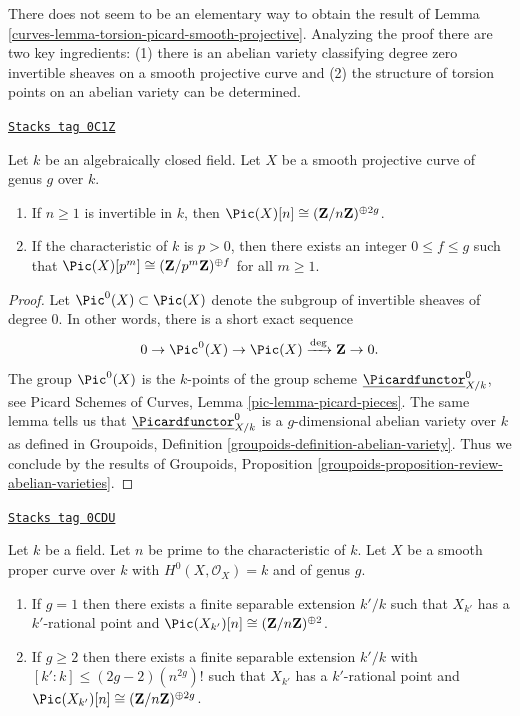 \medskip\noindent
There does not seem to be an elementary way to obtain the result of
Lemma \ref{curves-lemma-torsion-picard-smooth-projective}.
Analyzing the proof there are two key ingredients:
(1) there is an abelian variety classifying degree zero invertible sheaves on
a smooth projective curve and (2) the structure of torsion points on
an abelian variety can be determined.

\begin{lemma}
\label{curves-lemma-torsion-picard-smooth-projective}
\href{https://stacks.math.columbia.edu/tag/0C1Z}{\texttt{Stacks tag 0C1Z}}

Let $k$ be an algebraically closed field.
Let $X$ be a smooth projective curve of genus $g$ over $k$.
\begin{enumerate}
\item If $n \geq 1$ is invertible in $k$, then
$\Pic(X)[n] \cong (\mathbf{Z}/n\mathbf{Z})^{\oplus 2g}$.
\item If the characteristic of $k$ is $p > 0$, then there exists
an integer $0 \leq f \leq g$ such that
$\Pic(X)[p^m] \cong (\mathbf{Z}/p^m\mathbf{Z})^{\oplus f}$ for
all $m \geq 1$.
\end{enumerate}
\end{lemma}

\begin{proof}
Let $\Pic^0(X) \subset \Pic(X)$
denote the subgroup of invertible sheaves of degree $0$.
In other words, there is a short exact sequence
$$
0 \to \Pic^0(X) \to \Pic(X) \xrightarrow{\deg} \mathbf{Z} \to 0.
$$
The group $\Pic^0(X)$ is the $k$-points of
the group scheme $\underline{\Picardfunctor}^0_{X/k}$, see
Picard Schemes of Curves, Lemma \ref{pic-lemma-picard-pieces}.
The same lemma tells us that $\underline{\Picardfunctor}^0_{X/k}$
is a $g$-dimensional abelian variety over $k$ as defined in
Groupoids, Definition \ref{groupoids-definition-abelian-variety}.
Thus we conclude by the results of
Groupoids, Proposition \ref{groupoids-proposition-review-abelian-varieties}.
\end{proof}

\begin{lemma}
\label{curves-lemma-torsion-picard-becomes-visible}
\href{https://stacks.math.columbia.edu/tag/0CDU}{\texttt{Stacks tag 0CDU}}

Let $k$ be a field. Let $n$ be prime to the characteristic of $k$.
Let $X$ be a smooth proper curve over $k$ with $H^0(X, \mathcal{O}_X) = k$
and of genus $g$.
\begin{enumerate}
\item If $g = 1$ then there exists a finite separable extension
$k'/k$ such that $X_{k'}$ has a $k'$-rational point and
$\Pic(X_{k'})[n] \cong (\mathbf{Z}/n\mathbf{Z})^{\oplus 2}$.
\item If $g \geq 2$ then there exists a finite separable extension
$k'/k$ with $[k' : k] \leq (2g - 2)(n^{2g})!$
such that $X_{k'}$ has a $k'$-rational point and
$\Pic(X_{k'})[n] \cong (\mathbf{Z}/n\mathbf{Z})^{\oplus 2g}$.
\end{enumerate}
\end{lemma}

